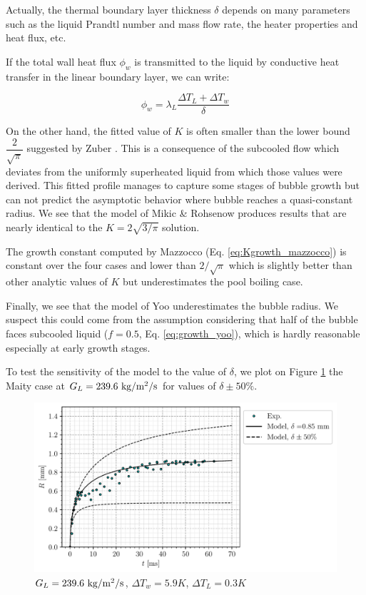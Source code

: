 \begin{remark*}{}
Actually, the thermal boundary layer thickness $\delta$ depends on many parameters such as the liquid Prandtl number and mass flow rate, the heater properties and heat flux, etc.

\npar

If the total wall heat flux $\phi_{w}$ is transmitted to the liquid by conductive heat transfer in the linear boundary layer, we can write:

\begin{equation}
\phi_{w} = \lambda_{L} \dfrac{\Delta T_{L} + \Delta T_{w}}{\delta}
\end{equation} 

\end{remark*}

\npar

On the other hand, the fitted value of $K$ is often smaller than the lower bound $\dfrac{2}{\sqrt{\pi}}$ suggested by Zuber \cite{zuber_dynamics_1961}. This is a consequence of the subcooled flow which deviates from the uniformly superheated liquid from which those values were derived. This fitted profile manages to capture some stages of bubble growth but can not predict the asymptotic behavior where bubble reaches a quasi-constant radius. We see that the model of Mikic \& Rohsenow produces results that are nearly identical to the $K=2\sqrt{3/\pi}$ solution.


The growth constant computed by Mazzocco \etal (Eq. \ref{eq:Kgrowth_mazzocco}) is constant over the four cases and lower than $2/\sqrt{\pi}$ which is slightly better than other analytic values of $K$ but underestimates the pool boiling case.


\npar

Finally, we see that the model of Yoo \etal underestimates the bubble radius. We suspect this could come from the assumption considering that half of the bubble faces subcooled liquid ($f=0.5$, Eq. \ref{eq:growth_yoo}), which is hardly reasonable especially at early growth stages.

\npar

To test the sensitivity of the model to the value of $\delta$, we plot on Figure \ref{fig:growth_newmod_sensi} the Maity case at $G_{L}=239.6~\text{kg/m$^{2}$/s}$ for values of $\delta \pm 50\%$.

\begin{figure}[!h]
\centering
\includegraphics[width=0.6\linewidth]{img/growth/SH5.9_SC0.3_V0.25_sensidelta.pdf}
\caption{$G_{L}=239.6~ \text{kg/m$^{2}$/s}$, $\Delta T_{w}=5.9K$, $\Delta T_{L}=0.3K$}
\label{fig:growth_newmod_sensi}
\end{figure}

